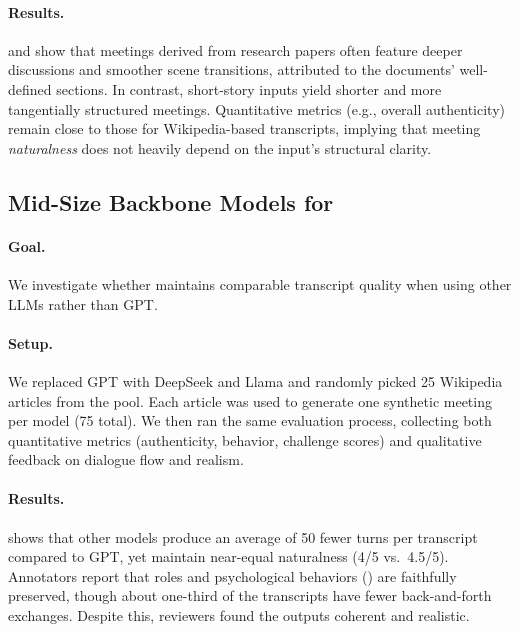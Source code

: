 \paragraph{Results.}
 and  show that meetings derived from research papers often feature deeper discussions and smoother scene transitions, attributed to the documents’ well-defined sections. 
In contrast, short-story inputs yield shorter and more tangentially structured meetings. Quantitative metrics (e.g., overall authenticity) remain close to those for Wikipedia-based transcripts, implying that meeting \emph{naturalness} does not heavily depend on the input’s structural clarity.









\subsection{Mid-Size Backbone Models for \pipeline{}}
\label{sec:app_mid_size_models}

\paragraph{Goal.}
We investigate whether \pipeline{} maintains comparable transcript quality when using other LLMs rather than GPT.

\paragraph{Setup.}
We replaced GPT with DeepSeek and Llama and randomly picked 25 Wikipedia articles from the \dataset{} pool. Each article was used to generate one synthetic meeting per model (75 total). We then ran the same evaluation process, collecting both quantitative metrics (authenticity, behavior, challenge scores) and qualitative feedback on dialogue flow and realism.

\paragraph{Results.}
 shows that other models produce an average of 50 fewer turns per transcript compared to GPT, yet maintain near-equal naturalness (4/5 vs.\ 4.5/5). Annotators report that roles and psychological behaviors () are faithfully preserved, though about one-third of the transcripts have fewer back-and-forth exchanges. Despite this, reviewers found the outputs coherent and realistic.



